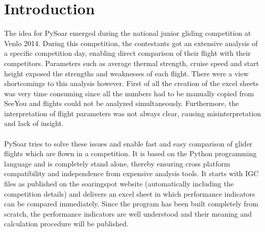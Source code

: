 \chapter*{Introduction}
The idea for PySoar emerged during the national junior gliding competition at Venlo 2014. During this competition, the contestants got an extensive analysis of a specific competition day, enabling direct comparison of their flight with their competitors. Parameters such as average thermal strength, cruise speed and start height exposed the strengths and weaknesses of each flight. There were a view shortcomings to this analysis however. First of all the creation of the excel sheets was very time consuming since all the numbers had to be manually copied from SeeYou and flights could not be analyzed simultaneously. Furthermore, the interpretation of flight parameters was not always clear, causing misinterpretation and lack of insight.\\
\ \\
PySoar tries to solve these issues and enable fast and easy comparison of glider flights which are flown in a competition. It is based on the Python programming language and is completely stand alone, thereby ensuring cross platform compatibility and independence from expensive analysis tools. It starts with IGC files as published on the soaringspot website (automatically including the competition details) and delivers an excel sheet in which performance indicators can be compared immediately. Since the program has been built completely from scratch, the performance indicators are well understood and their meaning and calculation procedure will be published.